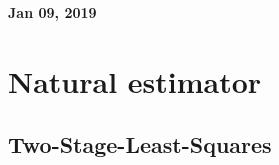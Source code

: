 \documentclass[11pt]{article}
\begin{document}
%

\newcommand{\Ito}{$It\hat{o}$'$s~Lemma$}

\newcommand\ind{\stackrel{\rm ind}{\sim}}
\newcommand\iid{\stackrel{\rm iid}{\sim}}
\renewcommand\c{\mathbf{c}}
\newcommand\y{\mathbf{y}}
\newcommand\z{\mathbf{z}}
\renewcommand\P{\mathbf{P}}
\newcommand\W{\mathbf{W}}
\newcommand\X{\mathbf{X}}
\newcommand\Y{\mathbf{Y}}
\newcommand\Z{\mathbf{Z}}
\newcommand\J{{\cal J}}
\newcommand\B{{\cal B}}
\newcommand\K{{\cal K}}
\newcommand\N{{\rm N}}
\newcommand\bs{\boldsymbol}
\newcommand\bth{\bs\theta}
\newcommand\bbe{\bs\beta}
\renewcommand\*{^\star}

\def\spacingset#1{\renewcommand{\baselinestretch}%
{#1}\small\normalsize} \spacingset{1}



  \bigskip
  \bigskip
  \bigskip
  \begin{center}
    {\LARGE\bf Jan 09, 2019 }
  \end{center}
  \medskip



\spacingset{1.45}



\section{Natural estimator} 

\subsection{Two-Stage-Least-Squares} 
\end{document}

